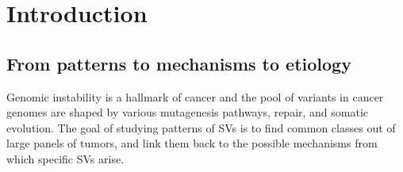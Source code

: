 \documentclass[phd,tocprelim]{cornell}
\begin{document}
\symlist

\normalspacing \setcounter{page}{1} 
\pagestyle{cornell} \addtolength{\parskip}{0.5\baselineskip}


\chapter{Introduction}



\section{From patterns to mechanisms to etiology}
Genomic instability is a hallmark of cancer \cite{Hanahan2011-ni} and the pool of variants in cancer genomes are shaped by various mutagenesis pathways, repair, and somatic evolution. The goal of studying patterns of SVs is to find common classes out of large panels of tumors, and link them back to the possible mechanisms from which specific SVs arise.
\end{document}
